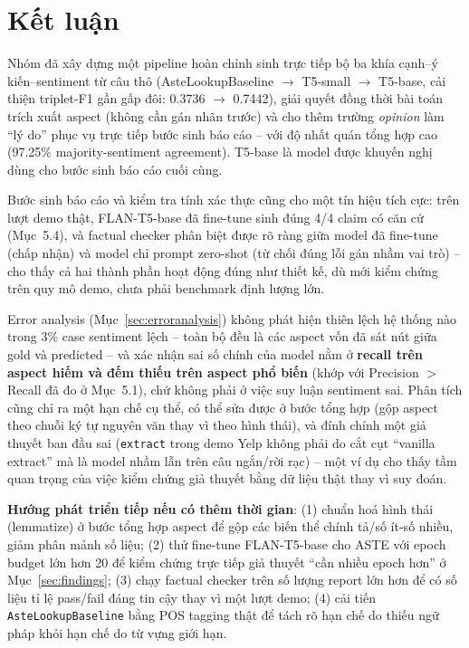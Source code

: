 \documentclass[11pt,a4paper]{article}
\begin{document}
\clearpage
\section{Kết luận}
\label{sec:conclusion}

Nhóm đã xây dựng một pipeline hoàn chỉnh sinh trực tiếp bộ ba khía
cạnh--ý kiến--sentiment từ câu thô (AsteLookupBaseline $\to$ T5-small
$\to$ T5-base, cải thiện triplet-F1 gần gấp đôi: 0.3736 $\to$ 0.7442),
giải quyết đồng thời bài toán trích xuất aspect (không cần gán nhãn
trước) và cho thêm trường \emph{opinion} làm ``lý do'' phục vụ trực tiếp
bước sinh báo cáo -- với độ nhất quán tổng hợp cao (97.25\%
majority-sentiment agreement). T5-base là model được khuyến nghị dùng
cho bước sinh báo cáo cuối cùng.

Bước sinh báo cáo và kiểm tra tính xác thực cũng cho một tín hiệu tích
cực: trên lượt demo thật, FLAN-T5-base đã fine-tune sinh đúng 4/4 claim
có căn cứ (Mục~5.4), và factual checker phân biệt được rõ ràng giữa
model đã fine-tune (chấp nhận) và model chỉ prompt zero-shot (từ chối
đúng lỗi gán nhầm vai trò) -- cho thấy cả hai thành phần hoạt động đúng
như thiết kế, dù mới kiểm chứng trên quy mô demo, chưa phải benchmark
định lượng lớn.

Error analysis (Mục~\ref{sec:erroranalysis}) không phát hiện thiên lệch
hệ thống nào trong 3\% case sentiment lệch -- toàn bộ đều là các aspect
vốn đã sát nút giữa gold và predicted -- và xác nhận sai số chính của
model nằm ở \textbf{recall trên aspect hiếm và đếm thiếu trên aspect phổ
biến} (khớp với Precision $>$ Recall đã đo ở Mục~5.1), chứ không phải ở
việc suy luận sentiment sai. Phân tích cũng chỉ ra một hạn chế cụ thể, có
thể sửa được ở bước tổng hợp (gộp aspect theo chuỗi ký tự nguyên văn thay
vì theo hình thái), và đính chính một giả thuyết ban đầu sai
(\texttt{extract} trong demo Yelp không phải do cắt cụt ``vanilla
extract'' mà là model nhầm lẫn trên câu ngắn/rời rạc) -- một ví dụ cho
thấy tầm quan trọng của việc kiểm chứng giả thuyết bằng dữ liệu thật thay
vì suy đoán.

\textbf{Hướng phát triển tiếp nếu có thêm thời gian}: (1) chuẩn hoá hình
thái (lemmatize) ở bước tổng hợp aspect để gộp các biến thể chính tả/số
ít-số nhiều, giảm phân mảnh số liệu; (2) thử fine-tune FLAN-T5-base cho
ASTE với epoch budget lớn hơn 20 để kiểm chứng trực tiếp giả thuyết ``cần
nhiều epoch hơn'' ở Mục~\ref{sec:findings}; (3) chạy factual checker trên
số lượng report lớn hơn để có số liệu tỉ lệ pass/fail đáng tin cậy thay
vì một lượt demo; (4) cải tiến \texttt{AsteLookupBaseline} bằng POS
tagging thật để tách rõ hạn chế do thiếu ngữ pháp khỏi hạn chế do từ
vựng giới hạn.
\end{document}
